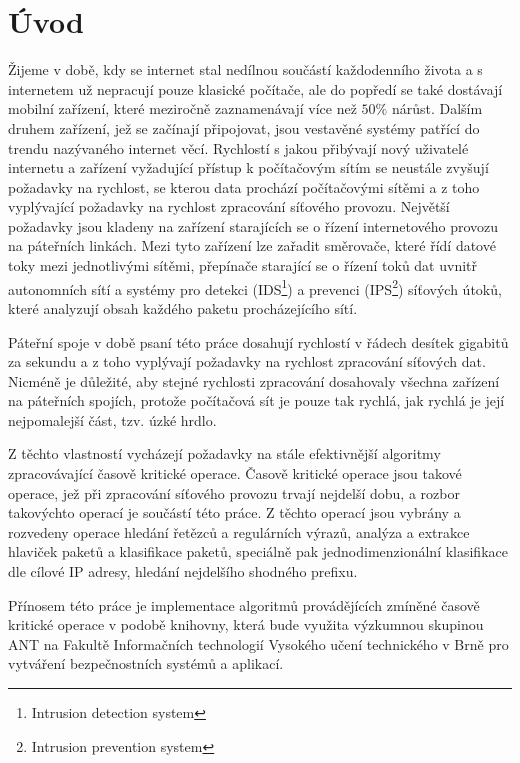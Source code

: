 
\chapter{Úvod} %

Žijeme v době, kdy se internet stal nedílnou součástí každodenního života a s internetem už nepracují
pouze klasické počítače, ale do popředí se také dostávají mobilní zařízení, které meziročně
zaznamenávají více než $50\%$ nárůst. Dalším druhem zařízení, jež se začínají připojovat,
jsou vestavěné systémy patřící do trendu nazývaného internet věcí.
Rychlostí s jakou přibývají nový uživatelé internetu a zařízení vyžadující přístup k počítačovým sítím
se neustále zvyšují požadavky na rychlost, se kterou data prochází počítačovými
sítěmi a z toho vyplývající požadavky na rychlost zpracování síťového provozu.
Největší požadavky jsou kladeny na zařízení starajících se o řízení internetového provozu na páteřních linkách.
Mezi tyto zařízení lze zařadit směrovače, které řídí datové toky mezi jednotlivými sítěmi,
přepínače starající se o řízení toků dat uvnitř autonomních sítí a
systémy pro detekci (IDS\footnote{Intrusion detection system}) a prevenci (IPS\footnote{Intrusion prevention system})
síťových útoků, které analyzují obsah každého paketu procházejícího sítí.

Páteřní spoje v době psaní této práce dosahují rychlostí v řádech desítek gigabitů
za sekundu a z toho vyplývají požadavky na rychlost zpracování síťových dat. Nicméně je důležité, aby stejné rychlosti zpracování dosahovaly všechna zařízení na páteřních spojích,
protože počítačová sít je pouze tak rychlá, jak rychlá je její nejpomalejší část, tzv. úzké hrdlo.

Z těchto vlastností vycházejí požadavky na stále efektivnější algoritmy zpracovávající časově kritické operace.
Časově kritické operace jsou takové operace, jež při zpracování síťového provozu trvají nejdelší dobu, a rozbor
takovýchto operací je součástí této práce. Z těchto operací jsou vybrány a rozvedeny operace
hledání řetězců a regulárních výrazů, analýza a extrakce hlaviček paketů a klasifikace paketů, speciálně pak jednodimenzionální klasifikace dle cílové IP adresy, hledání nejdelšího shodného prefixu.

Přínosem této práce je implementace algoritmů provádějících zmíněné časově kritické operace v podobě knihovny,
která bude využita výzkumnou skupinou ANT na Fakultě Informačních technologií Vysokého učení technického v Brně
pro vytváření bezpečnostních systémů a aplikací.

